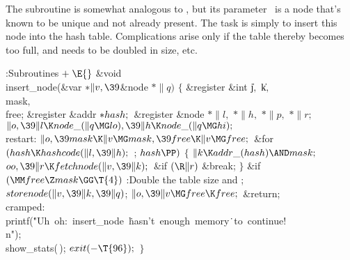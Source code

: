 The  subroutine is somewhat analogous to , but its
parameter~ is a node that's known to
be unique and not already present. The task is simply to insert
this node into the hash table. Complications arise only if the
table thereby becomes too full, and needs to be doubled in size, etc.

\Y\B\4:Subroutines\X${}\mathrel+\E{}$\6
\&{void} \\{insert\_node}(\&{var} ${}{*}\|v,\39{}$\&{node} ${}{*}\|q){}$\1\1\2%
\2\6
${}\{{}$\1\6
\&{register} \&{int} \|j${},{}$ \|k${},{}$ \\{mask}${},{}$ \\{free};\6
\&{register} \&{addr} ${}{*}\\{hash};{}$\6
\&{register} \&{node} ${}{*}\|l,{}$ ${}{*}\|h,{}$ ${}{*}\|p,{}$ ${}{*}\|r;{}$\7
${}\|o,\39\|l\K\\{node\_}(\|q\MG\\{lo}),\39\|h\K\\{node\_}(\|q\MG\\{hi});{}$\6
\4\\{restart}:\5
${}\|o,\39\\{mask}\K\|v\MG\\{mask},\39\\{free}\K\|v\MG\\{free};{}$\6
\&{for} ${}(\\{hash}\K\\{hashcode}(\|l,\39\|h);{}$  ; ${}\\{hash}\PP){}$\5
${}\{{}$\1\6
${}\|k\K\\{addr\_}(\\{hash})\AND\\{mask};{}$\6
${}\\{oo},\39\|r\K\\{fetchnode}(\|v,\39\|k);{}$\6
\&{if} ${}(\R\|r){}$\1\5
\&{break};\2\6
\4${}\}{}$\2\6
\&{if} ${}(\MM\\{free}\Z\\{mask}\GG\T{4}){}$\1\5
:Double the table size and \X;\2\6
${}\\{storenode}(\|v,\39\|k,\39\|q){}$;\5
${}\|o,\39\|v\MG\\{free}\K\\{free};{}$\6
\&{return};\6
\4\\{cramped}:\5
\\{printf}(\.{"Uh\ oh:\ insert\_node\ }\)\.{hasn't\ enough\ memory}\)\.{\ to\
continue!\\n"});\6
\\{show\_stats}(\,);\6
${}\\{exit}({-}\T{96});{}$\6
\4${}\}{}$\2\par
\fi

